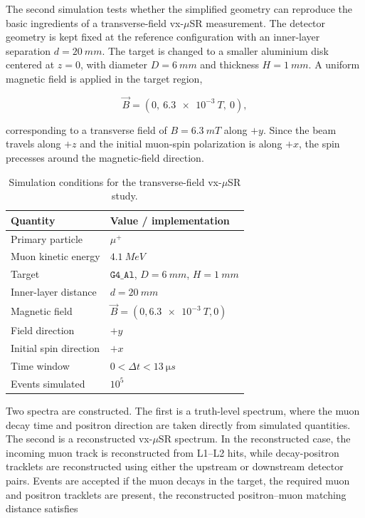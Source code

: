 \documentclass[11pt,a4paper]{article}
\begin{document}
The second simulation tests whether the simplified geometry can reproduce the basic ingredients of a transverse-field vx-$\mu$SR measurement. The detector geometry is kept fixed at the reference configuration with an inner-layer separation $d=\SI{20}{mm}$. The target is changed to a smaller aluminium disk centered at $z=0$, with diameter $D=\SI{6}{mm}$ and thickness $H=\SI{1}{mm}$. A uniform magnetic field is applied in the target region,

$$ \vec{B} = \left(0,~\SI{6.3e-3}{T},~0 \right), $$

\noindent corresponding to a transverse field of $B=\SI{6.3}{mT}$ along $+y$. Since the beam travels along $+z$ and the initial muon-spin polarization is along $+x$, the spin precesses around the magnetic-field direction.

\begin{table}[hbt]
\centering
\caption{Simulation conditions for the transverse-field vx-$\mu$SR study.}
\label{tab:sim2_conditions}
\begin{tabular}{ll}
\toprule
Quantity & Value / implementation \\
\midrule
Primary particle & $\mu^+$ \\
Muon kinetic energy & $\SI{4.1}{MeV}$ \\
Target & $\texttt{G4\_Al}$, $D=\SI{6}{mm}$, $H=\SI{1}{mm}$ \\
Inner-layer distance & $d=\SI{20}{mm}$ \\
Magnetic field & $\vec{B}=(0,\SI{6.3e-3}{T},0)$ \\
Field direction & $+y$ \\
Initial spin direction & $+x$ \\
Time window & $0 < \Delta t < \SI{13}{\micro s}$ \\
Events simulated & $10^5$ \\
\bottomrule
\end{tabular}
\end{table}

Two spectra are constructed. The first is a truth-level spectrum, where the muon decay time and positron direction are taken directly from simulated quantities. The second is a reconstructed vx-$\mu$SR spectrum. In the reconstructed case, the incoming muon track is reconstructed from L1--L2 hits, while decay-positron tracklets are reconstructed using either the upstream or downstream detector pairs. Events are accepted if the muon decays in the target, the required muon and positron tracklets are present, the reconstructed positron--muon matching distance satisfies
\end{document}
